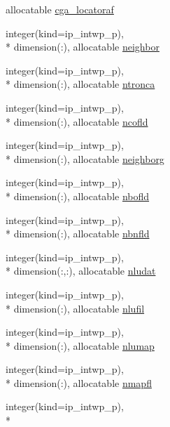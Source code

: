 \begin{DoxyCompactItemize}
allocatable \hyperlink{classmod__oasis__namcouple_a6f4080d45f0b9be5a0466967f535b83b}{cga\+\_\+locatoraf}
\item 
integer(kind=ip\+\_\+intwp\+\_\+p), \\*
dimension(\+:), allocatable \hyperlink{classmod__oasis__namcouple_a298c9165785ae1a41f89597cadd211e7}{neighbor}
\item 
integer(kind=ip\+\_\+intwp\+\_\+p), \\*
dimension(\+:), allocatable \hyperlink{classmod__oasis__namcouple_aaf9fd5eaa5d115f2548b8f78cdcd172d}{ntronca}
\item 
integer(kind=ip\+\_\+intwp\+\_\+p), \\*
dimension(\+:), allocatable \hyperlink{classmod__oasis__namcouple_a9f8a2a4f44b1c56860fef8df014339d3}{ncofld}
\item 
integer(kind=ip\+\_\+intwp\+\_\+p), \\*
dimension(\+:), allocatable \hyperlink{classmod__oasis__namcouple_a883d88938c50264711c53af2b555c3db}{neighborg}
\item 
integer(kind=ip\+\_\+intwp\+\_\+p), \\*
dimension(\+:), allocatable \hyperlink{classmod__oasis__namcouple_a21400200658d24cbf7484b5eb177c911}{nbofld}
\item 
integer(kind=ip\+\_\+intwp\+\_\+p), \\*
dimension(\+:), allocatable \hyperlink{classmod__oasis__namcouple_af0c7b1e7e49159c6b9c0dc3663264346}{nbnfld}
\item 
integer(kind=ip\+\_\+intwp\+\_\+p), \\*
dimension(\+:,\+:), allocatable \hyperlink{classmod__oasis__namcouple_abb7c2cd3a371bbb8ccd6a272d0e9b60f}{nludat}
\item 
integer(kind=ip\+\_\+intwp\+\_\+p), \\*
dimension(\+:), allocatable \hyperlink{classmod__oasis__namcouple_a31f62f64cbcf344e529d0576386d0751}{nlufil}
\item 
integer(kind=ip\+\_\+intwp\+\_\+p), \\*
dimension(\+:), allocatable \hyperlink{classmod__oasis__namcouple_a42367b4984c6ac4c69cbdcd315cb54e6}{nlumap}
\item 
integer(kind=ip\+\_\+intwp\+\_\+p), \\*
dimension(\+:), allocatable \hyperlink{classmod__oasis__namcouple_ac623e3e0906f57983efc1ab912ce9674}{nmapfl}
\item 
integer(kind=ip\+\_\+intwp\+\_\+p), \\*

\end{DoxyCompactItemize}
